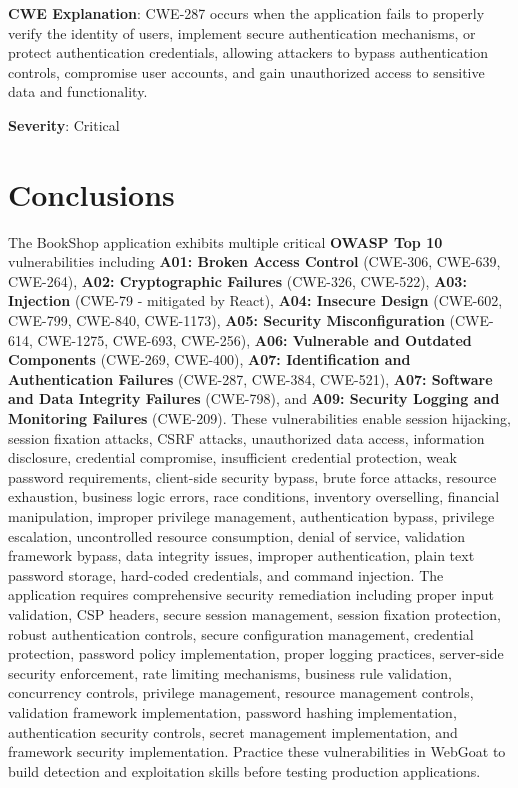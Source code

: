 \documentclass[]{UCD_CS_FYP_Report}
\begin{document}
\textbf{CWE Explanation}: CWE-287 occurs when the application fails to properly verify the identity of users, implement secure authentication mechanisms, or protect authentication credentials, allowing attackers to bypass authentication controls, compromise user accounts, and gain unauthorized access to sensitive data and functionality.

\textbf{Severity}: Critical


\chapter{Conclusions}

The BookShop application exhibits multiple critical \textbf{OWASP Top 10} vulnerabilities including \textbf{A01: Broken Access Control} (CWE-306, CWE-639, CWE-264), \textbf{A02: Cryptographic Failures} (CWE-326, CWE-522), \textbf{A03: Injection} (CWE-79 - mitigated by React), \textbf{A04: Insecure Design} (CWE-602, CWE-799, CWE-840, CWE-1173), \textbf{A05: Security Misconfiguration} (CWE-614, CWE-1275, CWE-693, CWE-256), \textbf{A06: Vulnerable and Outdated Components} (CWE-269, CWE-400), \textbf{A07: Identification and Authentication Failures} (CWE-287, CWE-384, CWE-521), \textbf{A07: Software and Data Integrity Failures} (CWE-798), and \textbf{A09: Security Logging and Monitoring Failures} (CWE-209). These vulnerabilities enable session hijacking, session fixation attacks, CSRF attacks, unauthorized data access, information disclosure, credential compromise, insufficient credential protection, weak password requirements, client-side security bypass, brute force attacks, resource exhaustion, business logic errors, race conditions, inventory overselling, financial manipulation, improper privilege management, authentication bypass, privilege escalation, uncontrolled resource consumption, denial of service, validation framework bypass, data integrity issues, improper authentication, plain text password storage, hard-coded credentials, and command injection. The application requires comprehensive security remediation including proper input validation, CSP headers, secure session management, session fixation protection, robust authentication controls, secure configuration management, credential protection, password policy implementation, proper logging practices, server-side security enforcement, rate limiting mechanisms, business rule validation, concurrency controls, privilege management, resource management controls, validation framework implementation, password hashing implementation, authentication security controls, secret management implementation, and framework security implementation. Practice these vulnerabilities in WebGoat to build detection and exploitation skills before testing production applications.
\end{document}
